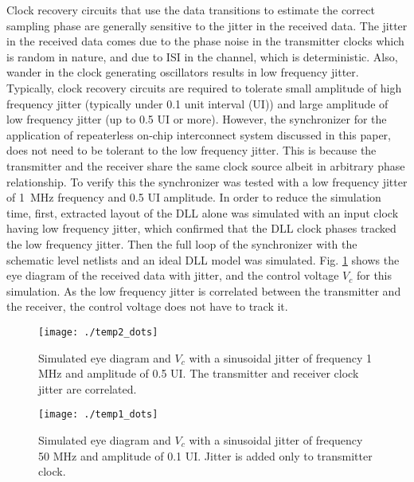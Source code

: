 \documentclass[journal,twoside,letterpaper]{IEEEtran}
\begin{document}
Clock recovery circuits that use the data transitions to estimate 
the correct sampling phase are generally sensitive to the jitter
in the received data. The jitter in the received data comes due to
the phase noise in the transmitter clocks which is random in nature,
and due to ISI in the channel, which is deterministic.
Also, wander in the clock generating
oscillators results in low frequency jitter. Typically, clock 
recovery circuits are required to tolerate small amplitude of 
high frequency jitter (typically under 0.1 unit interval (UI)) and large
amplitude of low frequency jitter (up to 0.5 UI or more). 
However, the synchronizer for the application of repeaterless on-chip interconnect 
system discussed in this paper, does not need to be tolerant to the low
frequency jitter. This is because the transmitter and the receiver share the same 
clock source albeit in arbitrary phase relationship. To verify this
the synchronizer was tested with a low frequency jitter of \mbox{1 MHz}
frequency and 0.5 UI amplitude. In order to reduce the simulation 
time, first, extracted layout of the DLL alone was simulated with
an input clock having low frequency jitter, which confirmed that the DLL clock
phases tracked the low frequency jitter. 
Then the full loop of the synchronizer with the schematic level
netlists and an ideal DLL model was simulated.
Fig. \ref{fig:data_1Mjitter} shows the eye diagram of the 
received data with jitter, and the control voltage $V_c$ for this simulation. 
As the low frequency jitter is correlated between 
the transmitter and the receiver, the control 
voltage does not have to track it.
\begin{figure}[h!]
\centering
{}
\texttt{[image: ./temp2\_dots]}
\caption{Simulated eye diagram and $V_c$ with a sinusoidal jitter of frequency 
1 MHz and amplitude of 0.5 UI. The transmitter and receiver clock 
jitter are correlated.}
\label{fig:data_1Mjitter}
\end{figure}
\begin{figure}[h!]
\centering
{}
\texttt{[image: ./temp1\_dots]}
\caption{Simulated eye diagram and $V_c$ with a sinusoidal jitter of frequency
50 MHz and amplitude of 0.1 UI. Jitter is added only to transmitter clock.}
\label{fig:data_50Mjitter}
\end{figure}
\end{document}

